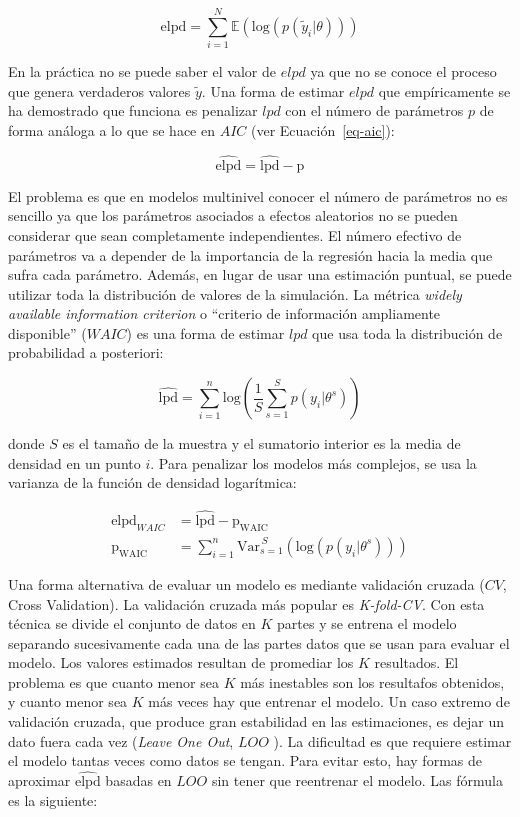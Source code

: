 \documentclass[
  12pt,
  a4paper,
  extrafontsizes,
  onecolumn,
  openright,
  table]{memoir}
\begin{document}
\[
\mathrm{elpd} = \sum_{i=1}^{N} \mathbb{E}(\mathrm{log} (p(\tilde{y}_i | \theta)))
\]

En la práctica no se puede saber el valor de \(elpd\) ya que no se
conoce el proceso que genera verdaderos valores \(\tilde{y}\). Una forma
de estimar \(elpd\) que empíricamente se ha demostrado que funciona es
penalizar \(lpd\) con el número de parámetros \(p\) de forma análoga a
lo que se hace en \(AIC\) (ver Ecuación~\ref{eq-aic}):

\[
\widehat{\mathrm{elpd}} = \widehat{\mathrm{lpd}} - \mathrm{p}
\]

El problema es que en modelos multinivel conocer el número de parámetros
no es sencillo ya que los parámetros asociados a efectos aleatorios no
se pueden considerar que sean completamente independientes. El número
efectivo de parámetros va a depender de la importancia de la regresión
hacia la media que sufra cada parámetro. Además, en lugar de usar una
estimación puntual, se puede utilizar toda la distribución de valores de
la simulación. La métrica \emph{widely available information criterion}
o \enquote{criterio de información ampliamente disponible} (\(WAIC\)) es
una forma de estimar \(lpd\) que usa toda la distribución de
probabilidad a posteriori:

\[
\widehat{\mathrm{lpd}} = \sum_{i=1}^{n} \mathrm{log} (\frac{1}{S} \sum_{s=1}^{S} p(y_{i} | \theta^s))
\]

donde \(S\) es el tamaño de la muestra y el sumatorio interior es la
media de densidad en un punto \(i\). Para penalizar los modelos más
complejos, se usa la varianza de la función de densidad logarítmica:

\[
\begin{aligned}
\widehat{\mathrm{elpd}}_{WAIC} &= \widehat{\mathrm{lpd}} - \mathrm{p_{WAIC}} \\
\mathrm{p_{\mathrm{WAIC}}} &= \sum_{i=1}^{n} \mathrm{Var}_{s=1}^{\,S}(\mathrm{log} (p(y_{i} | \theta^s)))
\end{aligned}
\]

Una forma alternativa de evaluar un modelo es mediante validación
cruzada (\(CV\), Cross Validation). La validación cruzada más popular es
\emph{K-fold-CV}. Con esta técnica se divide el conjunto de datos en
\(K\) partes y se entrena el modelo separando sucesivamente cada una de
las partes datos que se usan para evaluar el modelo. Los valores
estimados resultan de promediar los \(K\) resultados. El problema es que
cuanto menor sea \(K\) más inestables son los resultafos obtenidos, y
cuanto menor sea \(K\) más veces hay que entrenar el modelo. Un caso
extremo de validación cruzada, que produce gran estabilidad en las
estimaciones, es dejar un dato fuera cada vez (\emph{Leave One Out},
\(LOO\) ). La dificultad es que requiere estimar el modelo tantas veces
como datos se tengan. Para evitar esto, hay formas de aproximar
\(\widehat{\mathrm{elpd}}\) basadas en \(LOO\) sin tener que reentrenar
el modelo. Las fórmula es la siguiente:
\end{document}
